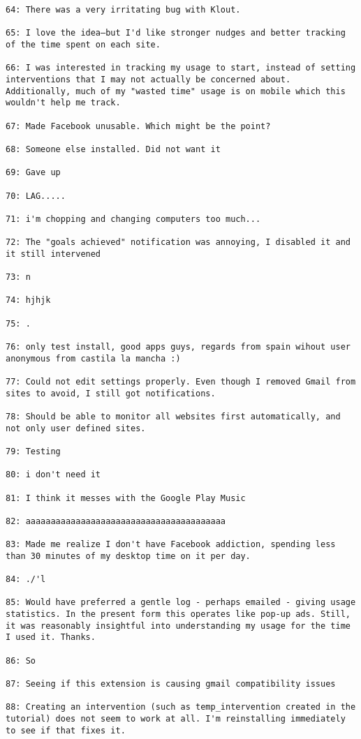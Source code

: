\begin{lstlisting}[breaklines]
64: There was a very irritating bug with Klout.

65: I love the idea—but I'd like stronger nudges and better tracking of the time spent on each site.

66: I was interested in tracking my usage to start, instead of setting interventions that I may not actually be concerned about. Additionally, much of my "wasted time" usage is on mobile which this wouldn't help me track.

67: Made Facebook unusable. Which might be the point?

68: Someone else installed. Did not want it

69: Gave up

70: LAG.....

71: i'm chopping and changing computers too much...

72: The "goals achieved" notification was annoying, I disabled it and it still intervened

73: n

74: hjhjk

75: .

76: only test install, good apps guys, regards from spain wihout user anonymous from castila la mancha :)

77: Could not edit settings properly. Even though I removed Gmail from sites to avoid, I still got notifications.

78: Should be able to monitor all websites first automatically, and not only user defined sites.

79: Testing

80: i don't need it

81: I think it messes with the Google Play Music

82: aaaaaaaaaaaaaaaaaaaaaaaaaaaaaaaaaaaaaaaa

83: Made me realize I don't have Facebook addiction, spending less than 30 minutes of my desktop time on it per day.

84: ./'l

85: Would have preferred a gentle log - perhaps emailed - giving usage statistics. In the present form this operates like pop-up ads. Still, it was reasonably insightful into understanding my usage for the time I used it. Thanks.

86: So

87: Seeing if this extension is causing gmail compatibility issues

88: Creating an intervention (such as temp_intervention created in the tutorial) does not seem to work at all. I'm reinstalling immediately to see if that fixes it.


\end{lstlisting}
